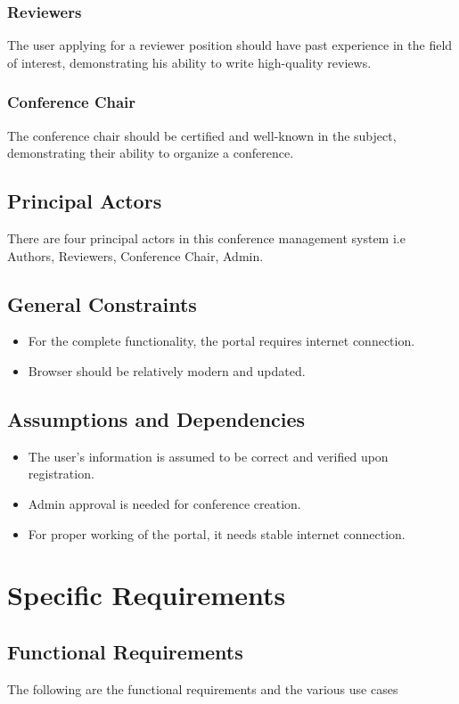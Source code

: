 \documentclass[english,a4paper,12pt]{report}
\begin{document}
\subsection{Reviewers}
The user applying for a reviewer position should have past experience in the field of interest, demonstrating his ability to write high-quality reviews.
\subsection{Conference Chair}
The conference chair should be certified and well-known in the subject, demonstrating their ability to organize a conference.
\section{Principal Actors}
There are four principal actors in this conference management system i.e Authors, Reviewers, Conference Chair, Admin.

\section{General Constraints}
\begin{itemize}
    \item For the complete functionality, the portal requires internet connection.
    \item Browser should be relatively modern and updated.
\end{itemize}

\section{Assumptions and Dependencies}
\begin{itemize}
    \item The user's information is assumed to be correct and verified upon registration.
    \item Admin approval is needed for conference creation.
    \item For proper working of the portal, it needs stable internet connection.
\end{itemize}


\chapter{Specific Requirements}
\section{Functional Requirements}
The following are the functional requirements and the various use cases 
\end{document}
